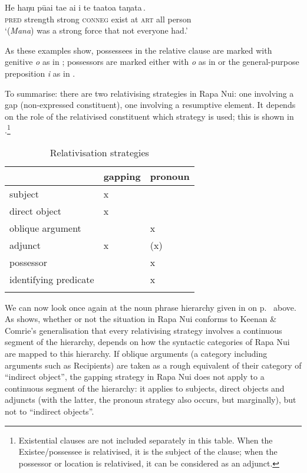 \ea\label{ex:11.109}
\gll He haŋu pūai {\ob}ta{\ꞌ}e ai i te ta{\ꞌ}ato{\ꞌ}a taŋata\,{\cb}. \\
\textsc{pred} strength strong {\db}\textsc{conneg} exist at \textsc{art} all person \\

\glt
‘(\textit{Mana}) was a strong force that not everyone had.’ \textstyleExampleref{[R634.002]} 
\z

As these examples show, possessees in the relative clause are marked with genitive \textit{o} as in ; possessors are marked either with \textit{o} as in  or the general-purpose preposition \textit{i} as in . 

To summarise: there are two relativising strategies in Rapa Nui: one involving a gap (non-expressed constituent), one involving a resumptive element. It depends on the role of the relativised constituent which strategy is used; this is shown in .\footnote{\label{fn:514}Existential clauses are not included separately in this table. When the Existee/possessee is relativised, it is the subject of the clause; when the possessor or location is relativised, it can be considered as an adjunct.}

\begin{table}
\begin{tabularx}{.66\textwidth}{L{39mm}Z{15mm}Z{15mm}} 
\lsptoprule
& {gapping}& {pronoun}\\
\midrule
subject & x& \\
direct object & x& \\
oblique argument &  & x\\
adjunct & x& (x)\\
{possessor} &  & x\\
identifying predicate &  & x\\
\lspbottomrule
\end{tabularx}
\caption{Relativisation strategies}
\label{tab:66}
\end{table}

We can now look once again at the noun phrase hierarchy given in  on p.~\pageref{ex:11.88a} above. As  shows, whether or not the situation in Rapa Nui conforms to Keenan \& Comrie’s generalisation that every relativising strategy involves a continuous segment of the hierarchy, depends on how the syntactic categories of Rapa Nui are mapped to this hierarchy. If oblique arguments (a category including arguments such as Recipients) are taken as a rough equivalent of their category of “indirect object”, the gapping strategy in Rapa Nui does not apply to a continuous segment of the hierarchy: it applies to subjects, direct objects and adjuncts (with the latter, the pronoun strategy also occurs, but marginally), but not to “indirect objects”.

